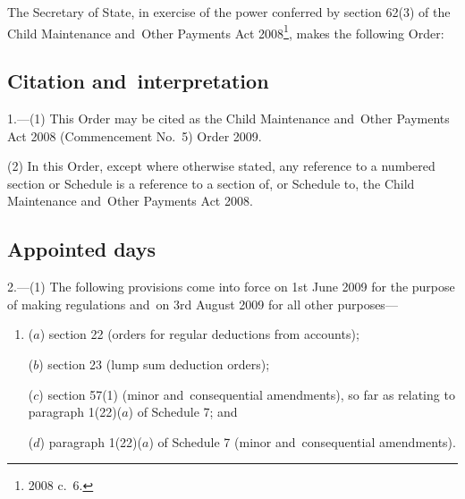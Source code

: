 \documentclass[12pt,a4paper]{article}
\title{\regstitle}
\author{S.I.\ 2009 No.\ 1314 (C.~72)}
\date{Made
28th May 2009
}
\begin{document}
\maketitle

\noindent
The Secretary of State, in exercise of the power conferred by section 62(3) of the Child Maintenance and~Other Payments Act 2008\footnote{2008 c.~6.}, makes the following Order: 

{\sloppy

\tableofcontents

}

\bigskip

\setcounter{secnumdepth}{-2}

\subsection[1. Citation and~interpretation]{Citation and~interpretation}

1.---(1)  This Order may be cited as the Child Maintenance and~Other Payments Act 2008 (Commencement No.~5) Order 2009.

(2) In this Order, except where otherwise stated, any reference to a numbered section or Schedule is a reference to a section of, or Schedule to, the Child Maintenance and~Other Payments Act 2008.

\subsection[2. Appointed days]{Appointed days}

2.---(1)  The following provisions come into force on 1st June 2009 for the purpose of making regulations and~on 3rd August 2009 for all other purposes—
\begin{enumerate}\item[]
($a$) section 22 (orders for regular deductions from accounts);

($b$) section 23 (lump sum deduction orders);

($c$) section 57(1) (minor and~consequential amendments), so far as relating to paragraph 1(22)($a$)  of Schedule 7; and

($d$) paragraph 1(22)($a$)  of Schedule 7 (minor and~consequential amendments).
\end{enumerate}
\end{document}
